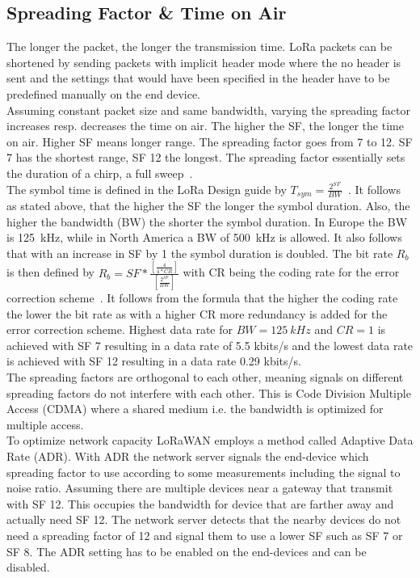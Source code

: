 \subsection{Spreading Factor \& Time on Air}
The longer the packet, the longer the transmission time. LoRa packets can be shortened
by sending packets with implicit header mode where the
no header is sent and the settings that would have been specified in the header have to be 
predefined manually on the end device.\\
Assuming constant packet size and same bandwidth, varying the spreading factor increases resp. decreases the time on air.
The higher the SF, the longer the time on air. Higher SF means longer range. The spreading factor goes from 7 to 12. SF 7 has 
the shortest range, SF 12 the longest. The spreading factor essentially sets the duration of a chirp, a full sweep~\cite{exploratory_eng}.
\\
The symbol time is defined in the LoRa Design guide by $T_{sym} = \frac{2^{SF}}{BW}$~\cite{SX_design_guide}.
It follows as stated above, that the higher the SF the longer the symbol duration. Also, the higher the bandwidth (BW) the shorter
the symbol duration. In Europe the BW is 125~kHz, while in North America a BW of 500~kHz is allowed.
It also follows that with an increase in SF by 1 the symbol duration is doubled. The bit rate $R_{b}$  is then defined by 
$R_{b} = SF*\frac{[\frac{4}{4 * CR}]}{[\frac{2^{SF}}{BW}]}$ with CR being the coding rate for the error correction scheme~\cite{lora_modulation_basics}.
It follows from the formula that the higher the coding rate the lower the bit rate as with a higher CR more redundancy is added 
for the error correction scheme. Highest data rate for $BW=125~kHz$ and $CR=1$ is achieved 
with SF 7 resulting in a data rate of 5.5 kbits/s and the lowest data rate is achieved with SF 12 resulting in a data rate 0.29 kbits/s.
\\
The spreading factors are orthogonal to each other, meaning signals on different spreading factors do not interfere with each other. This is 
Code Division Multiple Access (CDMA) where a shared medium i.e. the bandwidth is optimized for multiple access.
\\
To optimize network capacity LoRaWAN employs a method called Adaptive Data Rate (ADR). With ADR the network server signals 
the end-device which spreading factor to use according to some measurements including the signal to noise ratio. Assuming there are multiple devices near a gateway 
that transmit with SF 12. This occupies the bandwidth for device that are farther away and actually need SF 12.
The network server detects that the nearby devices do not need a spreading factor of 12 and signal them to use 
a lower SF such as SF 7 or SF 8. The ADR setting has to be enabled on the end-devices and can be disabled.

